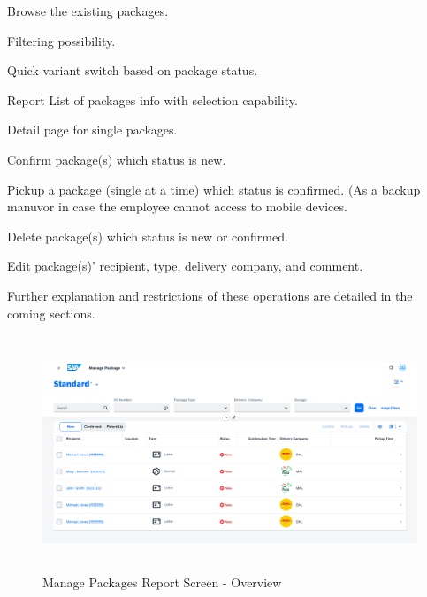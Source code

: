\begin{compactenum}
	\item Browse the existing packages.
        \begin{compactenum}
            \item Filtering possibility.
            \item Quick variant switch based on package status.
            \item Report List of packages info with selection capability.
            \item Detail page for single packages.
        \end{compactenum}
    \item Confirm package(s) which status is new.
    \item Pickup a package (single at a time) which status is confirmed. (As a backup manuvor in case the employee cannot access to mobile devices.
    \item Delete package(s) which status is new or confirmed.
    \item Edit package(s)' recipient, type, delivery company, and comment.
\end{compactenum}

\bigskip
Further explanation and restrictions of these operations are detailed in the coming sections.

\begin{figure}[H]
	\centering
	\includegraphics[height=200pt]{images/user_doc/managePack/ReportScreen/browse/Overview.png}
	\caption{Manage Packages Report Screen - Overview}
	\label{fig:MPReportOverview}
\end{figure}



